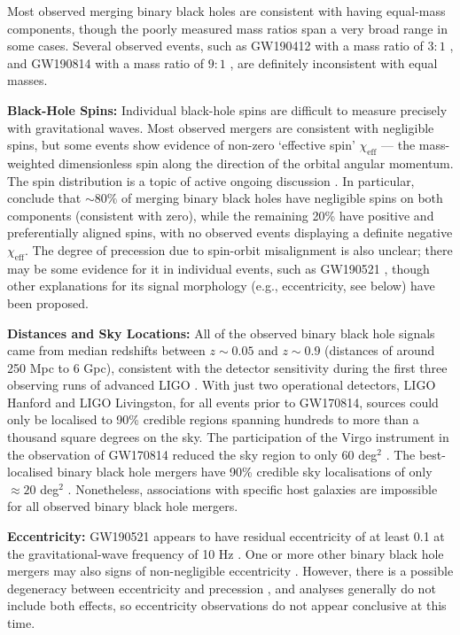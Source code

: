 \documentclass[review]{elsarticle}
\begin{document}
Most observed merging binary black holes are consistent with having equal-mass components, though the poorly measured mass ratios span a very broad range in some cases.  Several observed events, such as GW190412 with a mass ratio of $3:1$ \citep{GW190412}, and GW190814 with a mass ratio of $9:1$ \citep{GW190814}, are definitely inconsistent with equal masses.  

\textbf{Black-Hole Spins:} Individual black-hole spins are difficult to measure precisely with gravitational waves.  Most observed mergers are consistent with negligible spins, but some events show evidence of non-zero `effective spin' $\chi_\textrm{eff}$ --- the mass-weighted dimensionless spin along the direction of the orbital angular momentum.  The spin distribution is a topic of active ongoing discussion \citep[e.g.,][]{GWTC2:pop,Roulet:2021,Callister:2021,Galaudage:2021,GWTC3:pop}.  In particular, \citet{Galaudage:2021} conclude that $\sim 80\%$ of merging binary black holes have negligible spins on both components (consistent with zero), while the remaining 20\% have positive and preferentially aligned spins, with no observed events displaying a definite negative $\chi_\textrm{eff}$.  The degree of precession due to spin-orbit misalignment is also unclear; there may be some evidence for it in individual events, such as GW190521 \citep{GW190521}, though other explanations for its signal morphology (e.g., eccentricity, see below) have been proposed.

\textbf{Distances and Sky Locations:} All of the observed binary black hole signals came from median redshifts between $z\sim 0.05$ and $z \sim 0.9$ (distances of around 250 Mpc to 6 Gpc), consistent with the detector sensitivity during the first three observing runs of advanced LIGO \citep{GWTC3}.  With just two operational detectors, LIGO Hanford and LIGO Livingston, for all events prior to GW170814, sources could only be localised to 90\% credible regions spanning hundreds to more than a thousand square degrees on the sky.  The participation of the Virgo instrument in the observation of GW170814 reduced the sky region to only 60 deg$^2$ \citep{GW170814}.   The best-localised binary black hole mergers have 90\% credible sky localisations of only $\approx 20$ deg$^2$ \citep{GWTC2}.  Nonetheless, associations with specific host galaxies are impossible for all observed binary black hole mergers.  

\textbf{Eccentricity:}  GW190521 appears to have residual eccentricity of at least 0.1 at the gravitational-wave frequency of 10 Hz \citep{RomeroShaw:2020GW190521}.  One or more other binary black hole mergers may also signs of non-negligible eccentricity \citep{RomeroShaw:2021}.  However, there is a possible degeneracy between eccentricity and precession \citep{Bustillo:2021}, and analyses generally do not include both effects, so eccentricity observations do not appear conclusive at this time.
\end{document}
